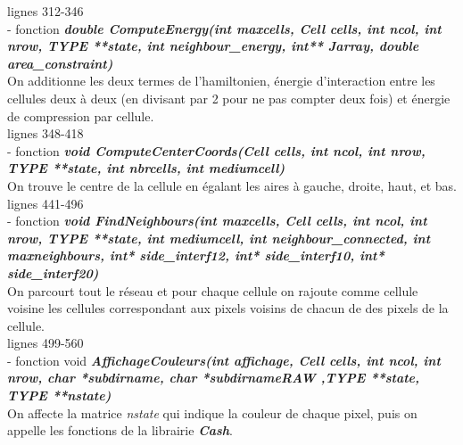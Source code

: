 \documentclass[11pt,a4paper]{article}
\begin{document}
lignes 312-346\\
- fonction \textbf{\textit{double ComputeEnergy(int maxcells, Cell cells, int ncol, int nrow, TYPE **state, int neighbour\_energy, int** Jarray, double area\_constraint)}}\\
On additionne les deux termes de l’hamiltonien, énergie d’interaction entre les cellules deux à deux (en divisant par 2 pour ne pas compter deux fois) et énergie de compression par cellule.\\

lignes 348-418\\
- fonction \textbf{\textit{void ComputeCenterCoords(Cell cells, int ncol, int nrow, TYPE **state, int nbrcells, int mediumcell)}}\\
On trouve le centre de la cellule en égalant les aires à gauche, droite, haut, et bas.\\

lignes 441-496\\
- fonction \textbf{\textit{void FindNeighbours(int maxcells, Cell cells, int ncol, int nrow, TYPE **state, int mediumcell, int neighbour\_connected, int maxneighbours, int* side\_interf12, int* side\_interf10, int* side\_interf20)}}\\
On parcourt tout le réseau et pour chaque cellule on rajoute comme cellule voisine les cellules correspondant aux pixels voisins de chacun de des pixels de la cellule.  \\

lignes 499-560\\
- fonction void \textbf{\textit{AffichageCouleurs(int affichage, Cell cells, int ncol, int nrow, char *subdirname, char *subdirnameRAW ,TYPE **state, TYPE **nstate)}}\\
On affecte la matrice \textit{nstate} qui indique la couleur de chaque pixel, puis on appelle les fonctions de la librairie \textbf{\textit{Cash}}.\\
\end{document}
